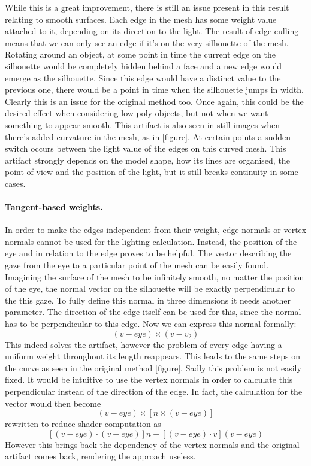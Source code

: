 \documentclass[a4paper, 12pt]{article}
\begin{document}
While this is a great improvement, there is still an issue present in this result relating to smooth surfaces. Each edge in the mesh has some weight value attached to it, depending on its direction to the light. The result of edge culling means that we can only see an edge if it's on the very silhouette of the mesh. Rotating around an object, at some point in time the current edge on the silhouette would be completely hidden behind a face and a new edge would emerge as the silhouette. Since this edge would have a distinct value to the previous one, there would be a point in time when the silhouette jumps in width. Clearly this is an issue for the original method too. Once again, this could be the desired effect when considering low-poly objects, but not when we want something to appear smooth. This artifact is also seen in still images when there's added curvature in the mesh, as in [figure]. At certain points a sudden switch occurs between the light value of the edges on this curved mesh. This artifact strongly depends on the model shape, how its lines are organised, the point of view and the position of the light, but it still breaks continuity in some cases.

\paragraph{Tangent-based weights.}
In order to make the edges independent from their weight, edge normals or vertex normals cannot be used for the lighting calculation. Instead, the position of the eye and in relation to the edge proves to be helpful. The vector describing the gaze from the eye to a particular point of the mesh can be easily found. Imagining the surface of the mesh to be infinitely smooth, no matter the position of the eye, the normal vector on the silhouette will be exactly perpendicular to the this gaze. To fully define this normal in three dimensions it needs another parameter. The direction of the edge itself can be used for this, since the normal has to be perpendicular to this edge. Now we can express this normal formally:
$$(v-eye) \times (v-v_2)$$
This indeed solves the artifact, however the problem of every edge having a uniform weight throughout its length reappears.  This leads to the same steps on the curve as seen in the original method [figure]. Sadly this problem is not easily fixed. It would be intuitive to use the vertex normals in order to calculate this perpendicular instead of the direction of the edge. In fact, the calculation for the vector would then become
$$(v-eye) \times [n \times (v-eye)]$$
rewritten to reduce shader computation as
$$[(v-eye) \cdot (v-eye)]n - [(v-eye) \cdot v](v-eye)$$
However this brings back the dependency of the vertex normals and the original artifact comes back, rendering the approach useless.
\end{document}
